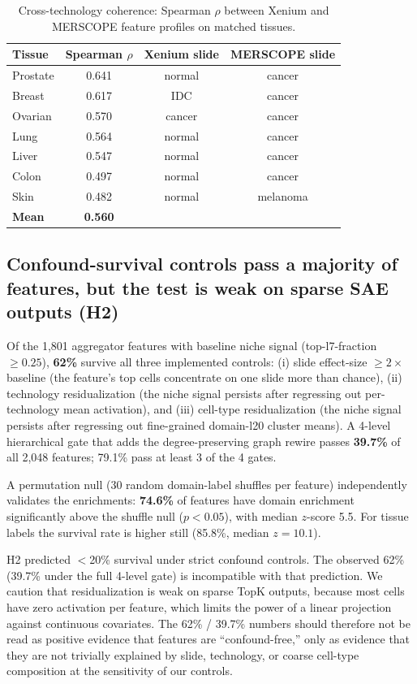 \documentclass[11pt]{article}
\begin{document}
\begin{table}[ht]
\centering
\caption{Cross-technology coherence: Spearman $\rho$ between Xenium and
MERSCOPE feature profiles on matched tissues.}
\label{tab:crosstech}
\begin{tabular}{lccc}
\toprule
Tissue & Spearman $\rho$ & Xenium slide & MERSCOPE slide \\
\midrule
Prostate & 0.641 & normal & cancer \\
Breast & 0.617 & IDC & cancer \\
Ovarian & 0.570 & cancer & cancer \\
Lung & 0.564 & normal & cancer \\
Liver & 0.547 & normal & cancer \\
Colon & 0.497 & normal & cancer \\
Skin & 0.482 & normal & melanoma \\
\midrule
\textbf{Mean} & \textbf{0.560} & & \\
\bottomrule
\end{tabular}
\end{table}

\subsection{Confound-survival controls pass a majority of features, but the test is weak on sparse SAE outputs (H2)}
\label{sec:h2}

Of the 1{,}801 aggregator features with baseline niche signal
(top-l7-fraction $\geq 0.25$), \textbf{62\%} survive all three
implemented controls: (i) slide effect-size $\geq 2\times$ baseline
(the feature's top cells concentrate on one slide more than chance),
(ii) technology residualization (the niche signal persists after
regressing out per-technology mean activation), and (iii) cell-type
residualization (the niche signal persists after regressing out
fine-grained domain-l20 cluster means). A 4-level hierarchical gate
that adds the degree-preserving graph rewire passes \textbf{39.7\%}
of all 2{,}048 features; 79.1\% pass at least 3 of the 4 gates.

A permutation null (30 random domain-label shuffles per feature)
independently validates the enrichments: \textbf{74.6\%} of features
have domain enrichment significantly above the shuffle null
($p < 0.05$), with median $z$-score 5.5. For tissue labels the
survival rate is higher still (85.8\%, median $z = 10.1$).

H2 predicted $<$20\% survival under strict confound controls. The
observed 62\% (39.7\% under the full 4-level gate) is incompatible
with that prediction. We caution that residualization is weak on
sparse TopK outputs, because most cells have zero activation per
feature, which limits the power of a linear projection against
continuous covariates. The 62\% / 39.7\% numbers should therefore
not be read as positive evidence that features are ``confound-free,''
only as evidence that they are not trivially explained by slide,
technology, or coarse cell-type composition at the sensitivity of
our controls.
\end{document}

